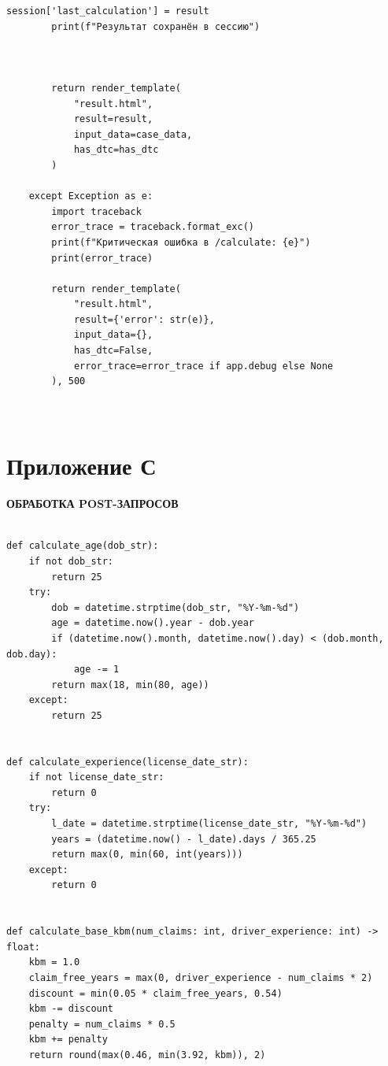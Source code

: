 \begin{lstlisting}[caption={Реализация эндпоинтов Flask}, label={lst:routes}    breaklines=true,
    breakatwhitespace=true,
    breakindent=10pt,
    columns=fullflexible
]
        session['last_calculation'] = result
        print(f"Результат сохранён в сессию")
    

        
        return render_template(
            "result.html",
            result=result,
            input_data=case_data,
            has_dtc=has_dtc
        )
        
    except Exception as e:
        import traceback
        error_trace = traceback.format_exc()
        print(f"Критическая ошибка в /calculate: {e}")
        print(error_trace)
        
        return render_template(
            "result.html",
            result={'error': str(e)},
            input_data={},
            has_dtc=False,
            error_trace=error_trace if app.debug else None
        ), 500



\end{lstlisting}


\newpage
\section*{Приложение С}
\label{app:post_handling}
\begin{center}
\textbf{ОБРАБОТКА POST-ЗАПРОСОВ}
\end{center}

\vspace{1cm}

\begin{lstlisting}[caption={Обработка данных формы калькулятора}, label={lst:post}    
    breakatwhitespace=true,
    breakindent=10pt,
    columns=fullflexible
]

def calculate_age(dob_str):
    if not dob_str:
        return 25
    try:
        dob = datetime.strptime(dob_str, "%Y-%m-%d")
        age = datetime.now().year - dob.year
        if (datetime.now().month, datetime.now().day) < (dob.month, dob.day):
            age -= 1
        return max(18, min(80, age))
    except:
        return 25


def calculate_experience(license_date_str):
    if not license_date_str:
        return 0
    try:
        l_date = datetime.strptime(license_date_str, "%Y-%m-%d")
        years = (datetime.now() - l_date).days / 365.25
        return max(0, min(60, int(years)))
    except:
        return 0


def calculate_base_kbm(num_claims: int, driver_experience: int) -> float:
    kbm = 1.0
    claim_free_years = max(0, driver_experience - num_claims * 2)
    discount = min(0.05 * claim_free_years, 0.54)
    kbm -= discount
    penalty = num_claims * 0.5
    kbm += penalty
    return round(max(0.46, min(3.92, kbm)), 2)

\end{lstlisting}

